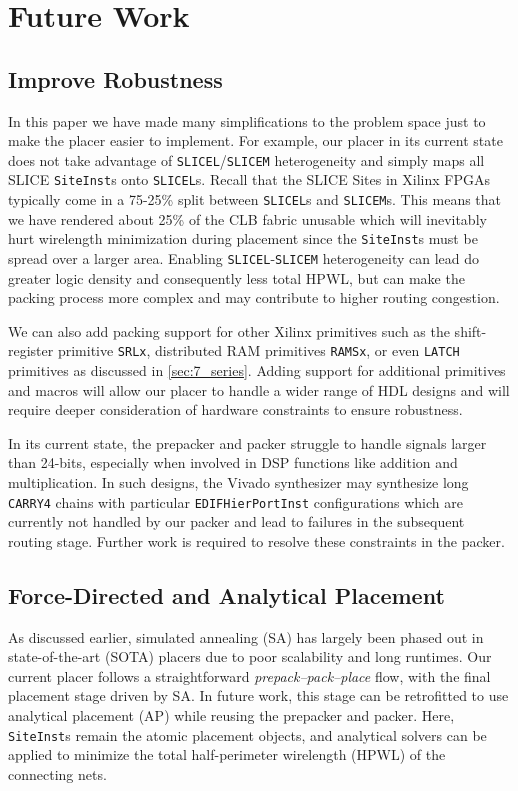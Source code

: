 \section{Future Work}


\subsection{Improve Robustness}
In this paper we have made many simplifications to the problem space just to make the placer easier to implement.
For example, our placer in its current state does not take advantage of \texttt{SLICEL}/\texttt{SLICEM} heterogeneity and simply maps all SLICE \texttt{SiteInst}s onto \texttt{SLICEL}s. 
Recall that the SLICE Sites in Xilinx FPGAs typically come in a 75-25\% split between \texttt{SLICEL}s and \texttt{SLICEM}s. 
This means that we have rendered about 25\% of the CLB fabric unusable which will inevitably hurt wirelength minimization during placement since the \texttt{SiteInst}s must be spread over a larger area. 
Enabling \texttt{SLICEL}-\texttt{SLICEM} heterogeneity can lead do greater logic density and consequently less total HPWL, but can make the packing process more complex and may contribute to higher routing congestion.

We can also add packing support for other Xilinx primitives such as the shift-register primitive \texttt{SRLx}, distributed RAM primitives \texttt{RAMSx}, or even \texttt{LATCH} primitives as discussed in \ref{sec:7_series}.
Adding support for additional primitives and macros will allow our placer to handle a wider range of HDL designs and will require deeper consideration of hardware constraints to ensure robustness.

In its current state, the prepacker and packer struggle to handle signals larger than 24-bits, especially when involved in DSP functions like addition and multiplication. 
In such designs, the Vivado synthesizer may synthesize long \texttt{CARRY4} chains with particular \texttt{EDIFHierPortInst} configurations which are currently not handled by our packer and lead to failures in the subsequent routing stage.
Further work is required to resolve these constraints in the packer.

\subsection{Force-Directed and Analytical Placement}
As discussed earlier, simulated annealing (SA) has largely been phased out in state-of-the-art (SOTA) placers due to poor scalability and long runtimes. 
Our current placer follows a straightforward \emph{prepack–pack–place} flow, with the final placement stage driven by SA. 
In future work, this stage can be retrofitted to use analytical placement (AP) while reusing the prepacker and packer. 
Here, \texttt{SiteInst}s remain the atomic placement objects, and analytical solvers can be applied to minimize the total half-perimeter wirelength (HPWL) of the connecting nets.

